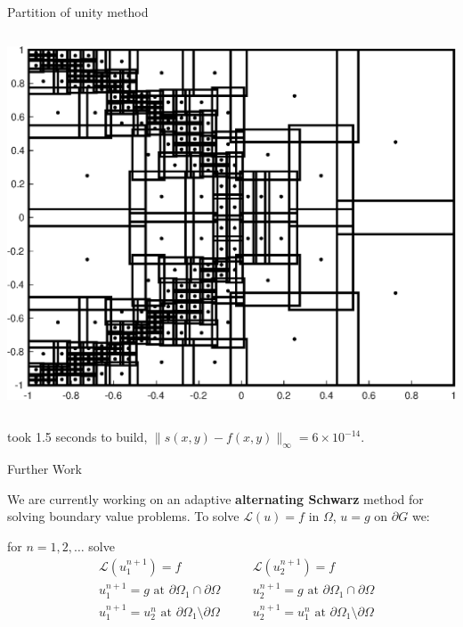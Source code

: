 \documentclass{beamer}
\begin{document}
\begin{frame}{Partition of unity method}
\begin{columns}[t]
\begin{column}{0.5\textwidth}
\begin{center}
\includegraphics[scale = 0.3]{tan2Dsubdomains.eps}	
\end{center}
\end{column}

\end{columns}

\begin{center}
took 1.5 seconds to build, $\| s(x,y)-f(x,y)\|_{\infty} = 6\times10^{-14}$.	
\end{center}

\end{frame}

\begin{frame}{Further Work}
	\begin{center}
		We are currently working on an adaptive \textbf{alternating Schwarz} method for solving boundary value problems. To solve $\mathcal{L}(u)=f$ in $\Omega$, $u=g$ on $\partial G$ we:
	\end{center}
	
	\begin{center}
	for $n=1,2,\dots$ solve
	\begin{equation*}
	\begin{aligned}
	&\mathcal{L}(u_1^{n+1})=f \\
	&u_1^{n+1} = g \text{ at } \partial\Omega_1 \cap \partial\Omega \\
	&u_1^{n+1} = u_2^{n} \text{ at } \partial\Omega_1 \setminus \partial\Omega 
	\end{aligned} \quad 	\begin{aligned}
	&\mathcal{L}(u_2^{n+1})=f \\
	&u_2^{n+1} = g \text{ at } \partial\Omega_1 \cap \partial\Omega \\
	&u_2^{n+1} = u_1^{n} \text{ at } \partial\Omega_1 \setminus \partial\Omega 
	\end{aligned}
	\end{equation*}	
	\end{center}

\end{frame}
\end{document}
